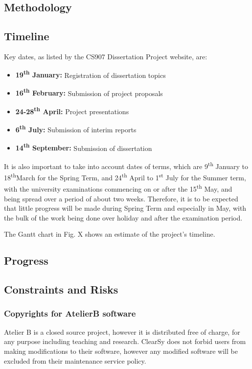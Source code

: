 \documentclass[11pt,journal]{IEEEtran}
\begin{document}
	\subsection{Methodology}
	
	\subsection{Timeline}
	Key dates, as listed by the CS907 Dissertation Project website, are:
	
	\begin{itemize}
		\item \textbf{19\textsuperscript{th} January:} Registration of dissertation topics
		\item \textbf{16\textsuperscript{th} February:} Submission of project proposals
		\item \textbf{24-28\textsuperscript{th} April:} Project presentations
		\item \textbf{6\textsuperscript{th} July:} Submission of interim reports
		\item \textbf{14\textsuperscript{th} September:} Submission of dissertation
	\end{itemize}

	It is also important to take into account dates of terms, which are 9\textsuperscript{th} January to 18\textsuperscript{th}March for the Spring Term, and 24\textsuperscript{th} April to 1\textsuperscript{st} July for the Summer term, with the university examinations commencing on or after the 15\textsuperscript{th} May, and being spread over a period of about two weeks. Therefore, it is to be expected that little progress will be made during Spring Term and especially in May, with the bulk of the work being done over holiday and after the examination period.
	
	The Gantt chart in Fig. X shows an estimate of the project's timeline. 
		
	\subsection{Progress}
	
	\subsection{Constraints and Risks}
	\subsubsection{Copyrights for AtelierB software}
	Atelier B is a closed source project, however it is distributed free of charge, for any purpose including teaching and research. ClearSy does not forbid users from making modifications to their software, however any modified software will be excluded from their maintenance service policy.
	
\end{document}
